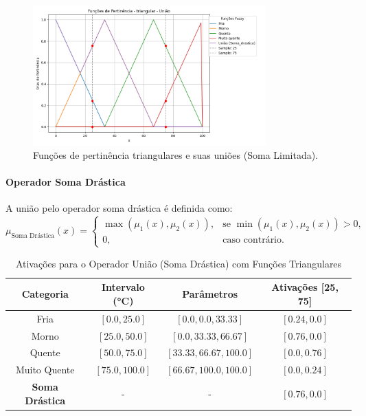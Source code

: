 \documentclass[a4paper,12pt]{article}
\begin{document}
\begin{figure}[H]
    \centering
    \includegraphics[width=0.8\textwidth]{img/funções_de_pertinência_triangular_união_fuzzificado.png}
    \caption{Funções de pertinência triangulares e suas uniões (Soma Limitada).}
    \label{fig:uniao_soma_limitada_triangular}
\end{figure}

\paragraph{Operador Soma Drástica}

A união pelo operador soma drástica é definida como:
\[
\mu_{\text{Soma Drástica}}(x) =
\begin{cases}
\max(\mu_1(x), \mu_2(x)), & \text{se } \min(\mu_1(x), \mu_2(x)) > 0, \\
0, & \text{caso contrário.}
\end{cases}
\]

\begin{table}[H]
\centering
\caption{Ativações para o Operador União (Soma Drástica) com Funções Triangulares}
\begin{tabular}{|c|c|c|c|}
\hline
\textbf{Categoria}    & \textbf{Intervalo (°C)} & \textbf{Parâmetros}       & \textbf{Ativações [25, 75]} \\ \hline
Fria                  & $[0.0, 25.0]$          & $[0.0, 0.0, 33.33]$       & $[0.24, 0.0]$              \\ \hline
Morno                 & $[25.0, 50.0]$         & $[0.0, 33.33, 66.67]$     & $[0.76, 0.0]$              \\ \hline
Quente                & $[50.0, 75.0]$         & $[33.33, 66.67, 100.0]$   & $[0.0, 0.76]$              \\ \hline
Muito Quente          & $[75.0, 100.0]$        & $[66.67, 100.0, 100.0]$   & $[0.0, 0.24]$              \\ \hline
\textbf{Soma Drástica} & -            & -                         & $[0.76, 0.0]$             \\ \hline
\end{tabular}
\end{table}
\end{document}

